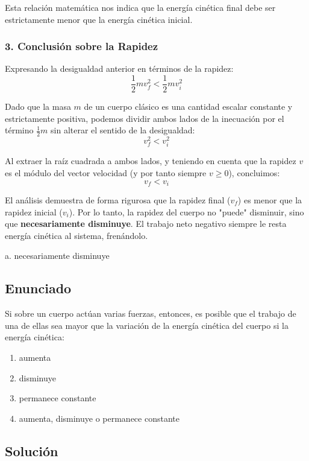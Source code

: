 \documentclass[12pt, a4paper]{article}
\begin{document}
Esta relación matemática nos indica que la energía cinética final debe ser estrictamente menor que la energía cinética inicial. 

\subsubsection*{3. Conclusión sobre la Rapidez}
Expresando la desigualdad anterior en términos de la rapidez:
$$\frac{1}{2} m v_f^2 < \frac{1}{2} m v_i^2$$

Dado que la masa $m$ de un cuerpo clásico es una cantidad escalar constante y estrictamente positiva, podemos dividir ambos lados de la inecuación por el término $\frac{1}{2} m$ sin alterar el sentido de la desigualdad:
$$v_f^2 < v_i^2$$

Al extraer la raíz cuadrada a ambos lados, y teniendo en cuenta que la rapidez $v$ es el módulo del vector velocidad (y por tanto siempre $v \geq 0$), concluimos:
$$v_f < v_i$$

El análisis demuestra de forma rigurosa que la rapidez final ($v_f$) es menor que la rapidez inicial ($v_i$). Por lo tanto, la rapidez del cuerpo no "puede" disminuir, sino que \textbf{necesariamente disminuye}. El trabajo neto negativo siempre le resta energía cinética al sistema, frenándolo.

\begin{tcolorbox}[colback=green!5!white, colframe=green!50!black, title=Respuesta Correcta]
\centering \Large a. necesariamente disminuye
\end{tcolorbox}

\newpage

\subsection*{Enunciado}
Si sobre un cuerpo actúan varias fuerzas, entonces, es posible que el trabajo de una de ellas sea mayor que la variación de la energía cinética del cuerpo si la energía cinética:
\begin{enumerate}[label=\alph*.]
    \item aumenta
    \item disminuye
    \item permanece constante
    \item aumenta, disminuye o permanece constante
\end{enumerate}

\subsection*{Solución}
\end{document}
